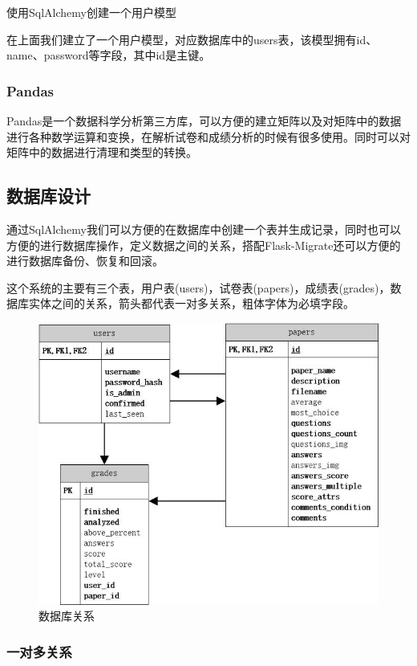 \begin{center}
	{\small 使用SqlAlchemy创建一个用户模型}
\end{center}

在上面我们建立了一个用户模型，对应数据库中的users表，该模型拥有id、name、password等字段，其中id是主键。

\subsubsection{Pandas}

Pandas是一个数据科学分析第三方库，可以方便的建立矩阵以及对矩阵中的数据进行各种数学运算和变换，在解析试卷和成绩分析的时候有很多使用。同时可以对矩阵中的数据进行清理和类型的转换。

\subsection{数据库设计}

通过SqlAlchemy我们可以方便的在数据库中创建一个表并生成记录，同时也可以方便的进行数据库操作，定义数据之间的关系，搭配Flask-Migrate还可以方便的进行数据库备份、恢复和回滚。

这个系统的主要有三个表，用户表(users)，试卷表(papers)，成绩表(grades)，数据库实体之间的关系，箭头都代表一对多关系，粗体字体为必填字段。

\begin{figure}[thbp!]
	\centering
	\includegraphics[width=0.7\linewidth]{figure/entity_relationship}
	\caption{数据库关系}
	\label{fig:entity_relationship}
\end{figure}

\subsubsection{一对多关系}

